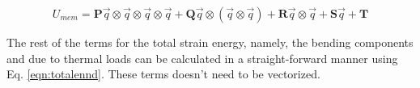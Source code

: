 \documentclass[journal]{new-aiaa}
\begin{document}


\begin{equation}
	U_{mem}=\mathds{\textbf{P}}\vec{q} \otimes \vec{q} \otimes \vec{q} \otimes \vec{q}  + \mathds{\textbf{Q}}\vec{q} \otimes \left( \vec{q} \otimes \vec{q}\right) + \mathds{\textbf{R}}\vec{q} \otimes \vec{q} +  \mathds{\textbf{S}}\vec{q} + \mathds{\textbf{T}}
\end{equation}

The rest of the terms for the total strain energy, namely, the bending components and due to thermal loads can be calculated in a straight-forward manner using Eq. \ref{eqn:totalennd}. These terms doesn't need to be vectorized.
\end{document}
